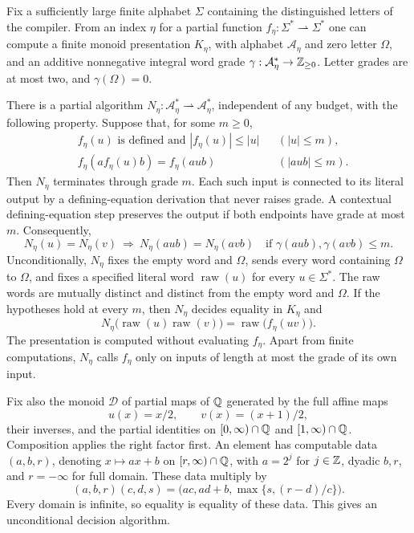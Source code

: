 \begin{lemma}\label{lem:compiler}
Fix a sufficiently large finite alphabet $\Sigma$ containing the
distinguished letters of the compiler.  From an index $\eta$ for
a partial function $f_\eta:\Sigma^*\rightharpoonup\Sigma^*$ one
can compute a finite monoid presentation $K_\eta$, with alphabet
$\mathcal A_\eta$ and zero letter $\Omega$, and an additive
nonnegative integral word grade
$\gamma:\mathcal A_\eta^*\to\mathbb Z_{\geq0}$. Letter grades are at
most two, and $\gamma(\Omega)=0$.

There is a partial algorithm
$N_\eta:\mathcal A_\eta^*\rightharpoonup\mathcal A_\eta^*$,
independent of any budget,
with the following property.  Suppose that, for some $m\geq0$,
\begin{align}
 &f_\eta(u)\text{ is defined and }|f_\eta(u)|\leq |u|
       &&(|u|\leq m),\label{eq:compiler-budget-total}\\
 &f_\eta(a f_\eta(u)b)=f_\eta(aub)
       &&(|aub|\leq m).\label{eq:compiler-budget-context}
\end{align}
Then $N_\eta$ terminates through grade $m$.  Each such input is
connected to its literal output by a defining-equation derivation
that never raises grade.  A contextual defining-equation step
preserves the output if both endpoints have grade at most $m$.
Consequently,
\begin{equation}\label{eq:compiler-context}
 N_\eta(u)=N_\eta(v)\ \Longrightarrow\
 N_\eta(aub)=N_\eta(avb)
 \quad\text{if }\gamma(aub),\gamma(avb)\leq m.
\end{equation}
Unconditionally, $N_\eta$ fixes the empty word and $\Omega$,
sends every word containing $\Omega$ to $\Omega$, and fixes a
specified literal word $\operatorname{raw}(u)$ for every
$u\in\Sigma^*$.  The raw words are mutually distinct and distinct
from the empty word and $\Omega$.  If the hypotheses hold at every
$m$, then $N_\eta$ decides equality in $K_\eta$ and
\begin{equation}\label{eq:compiler-raw-product}
 N_\eta\bigl(\operatorname{raw}(u)\operatorname{raw}(v)\bigr)
   =\operatorname{raw}\bigl(f_\eta(uv)\bigr).
\end{equation}
The presentation is computed without evaluating $f_\eta$.
Apart from finite computations, $N_\eta$ calls $f_\eta$ only on
inputs of length at most the grade of its own input.
\end{lemma}

Fix also the monoid $\mathcal D$ of partial maps of $\mathbb Q$ generated
by the full affine maps
\[
 u(x)=x/2,\qquad v(x)=(x+1)/2,
\]
their inverses, and the partial identities on
$[0,\infty)\cap\mathbb Q$ and $[1,\infty)\cap\mathbb Q$.
Composition applies the right factor first.  An element has
computable data $(a,b,r)$, denoting $x\mapsto ax+b$ on
$[r,\infty)\cap\mathbb Q$, with $a=2^j$ for $j\in\mathbb Z$, dyadic $b,r$,
and $r=-\infty$ for full domain.  These data multiply by
\begin{equation}\label{eq:partial-affine-data}
 (a,b,r)(c,d,s)
   =\bigl(ac,ad+b,\max\{s,(r-d)/c\}\bigr).
\end{equation}
Every domain is infinite, so equality is equality of these data.
This gives an unconditional decision algorithm.

